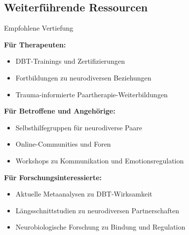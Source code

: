 \subsection{Weiterführende Ressourcen}

\begin{ctmmGreenBox}{Empfohlene Vertiefung}

\textbf{Für Therapeuten:}
\begin{itemize}
  \item DBT-Trainings und Zertifizierungen
  \item Fortbildungen zu neurodiversen Beziehungen
  \item Trauma-informierte Paartherapie-Weiterbildungen
\end{itemize}

\textbf{Für Betroffene und Angehörige:}
\begin{itemize}
  \item Selbsthilfegruppen für neurodiverse Paare
  \item Online-Communities und Foren
  \item Workshops zu Kommunikation und Emotionsregulation
\end{itemize}

\textbf{Für Forschungsinteressierte:}
\begin{itemize}
  \item Aktuelle Metaanalysen zu DBT-Wirksamkeit
  \item Längsschnittstudien zu neurodiversen Partnerschaften
  \item Neurobiologische Forschung zu Bindung und Regulation
\end{itemize}

\end{ctmmGreenBox}

\newpage
